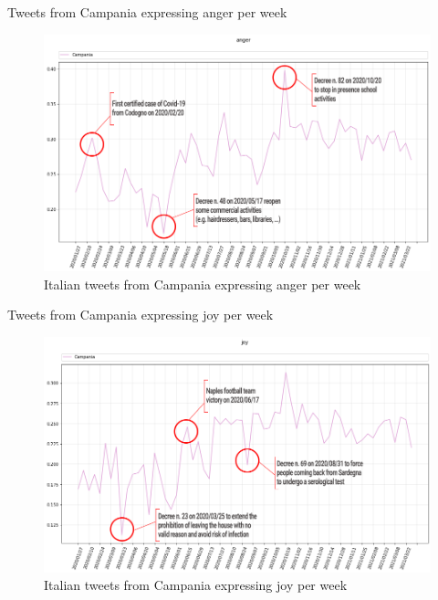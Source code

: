 \documentclass[8pt]{beamer}  %
\begin{document}
\begin{frame}{Tweets from Campania expressing anger per week}
    
    \begin{figure}
        \centering
        \includegraphics[scale=0.3]{assets/img/it_Campania_anger_with_events.png}
        \caption{Italian tweets from Campania expressing anger per week}
        \label{fig:it_Campania_anger}
    \end{figure}
    
\end{frame}

\begin{frame}{Tweets from Campania expressing joy per week}
    
    \begin{figure}
        \centering
        \includegraphics[scale=0.3]{assets/img/it_Campania_joy_with_events.png}
        \caption{Italian tweets from Campania expressing joy per week}
        \label{fig:it_Campania_joy}
    \end{figure}
    
\end{frame}
\end{document}

